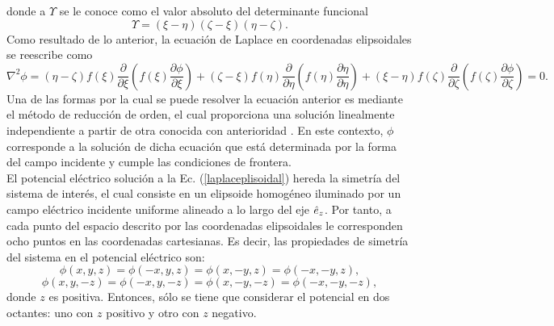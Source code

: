 donde a $\Upsilon$ se le conoce como el valor absoluto del determinante funcional \cite{Kellog}
\begin{equation}
	\Upsilon=(\xi-\eta)(\zeta-\xi)(\eta-\zeta).
\end{equation}
Como resultado de lo anterior, la ecuación de Laplace en coordenadas elipsoidales se reescribe como
\begin{equation}
	\nabla^2\phi=(\eta-\zeta)f(\xi)\frac{\partial}{\partial\xi}\left(f(\xi)\frac{\partial\phi}{\partial\xi}\right)+(\zeta-\xi)f(\eta)\frac{\partial}{\partial\eta}\left(f(\eta)\frac{\partial\eta}{\partial\eta}\right)+(\xi-\eta)f(\zeta)\frac{\partial}{\partial\zeta}\left(f(\zeta)\frac{\partial\phi}{\partial\zeta}\right)=0.
	\label{laplaceplisoidal}
\end{equation}
Una de las formas por la cual se puede resolver la ecuación anterior es mediante el método de reducción de orden, el cual proporciona una solución linealmente independiente a partir de otra conocida con anterioridad \cite{Braun}. En este contexto, $\phi$ corresponde a la solución de dicha ecuación que está determinada por la forma del campo incidente y cumple las condiciones de frontera. \\


El potencial eléctrico solución a la Ec. (\ref{laplaceplisoidal}) hereda la simetría del sistema de interés, el cual consiste en un elipsoide homogéneo iluminado por un campo eléctrico incidente uniforme alineado a lo largo del eje $\hat{e}_{z}$. Por tanto,  a cada punto del espacio descrito por las coordenadas elipsoidales le corresponden ocho puntos en las coordenadas cartesianas. Es decir, las propiedades de simetría del sistema en el potencial eléctrico son:
\begin{equation}
    \phi(x,y,z)=\phi(-x,y,z)=\phi(x,-y,z)=\phi(-x,-y,z),
\end{equation}
\begin{equation}
    \phi(x,y,-z)=\phi(-x,y ,-z)=\phi(x,-y,-z)=\phi(-x,-y,-z),
\end{equation}
donde $z$ es positiva. Entonces, sólo se tiene que considerar el potencial en dos octantes: uno con $z$ positivo y otro con $z$ negativo. \\

